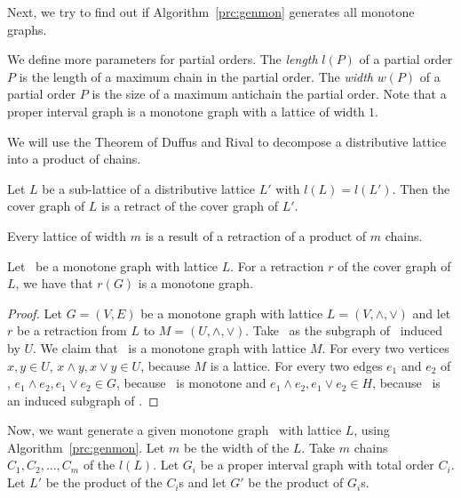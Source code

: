 Next, we try to find out if Algorithm~\ref{prc:genmon} generates all monotone graphs.

We define more parameters for partial orders.
The \emph{length} \(l(P)\) of a partial order \(P\) is the length of a maximum chain in
the partial order. The \emph{width} \(w(P)\) of a partial order \(P\)
is the size of a maximum antichain the partial order.
Note that a proper interval graph is a monotone graph with a lattice of width \(1\)\@.

We will use the Theorem of Duffus and Rival to decompose a distributive lattice into a
product of chains.

\begin{theorem}  \label{thm:DR}
Let \(L\) be a sub-lattice of a distributive lattice \(L'\) with
\(l(L)=l(L')\)\@. Then the cover graph of \(L\) is a retract of the cover graph of 
\(L'\)\@.
\end{theorem}

\begin{cor}
Every lattice of width \(m\) is a result of a retraction of a product of \(m\) chains.
\end{cor}

\begin{lemma} \label{lem:retract}
Let \mG\ be a monotone graph with lattice \(L\)\@.
For a retraction \(r\) of the cover graph of \(L\), we have that \(r(G)\) is a monotone graph.
\end{lemma}

\begin{proof}
Let \(G=(V,E)\) be a monotone graph with lattice \(L=(V, \wedge,\vee)\) and
let \(r\) be a retraction from \(L\) to \(M =(U, \wedge, \vee)\)\@.
Take \mH\ as the subgraph of \mG\ induced by \(U\)\@.
We claim that \mH\ is a monotone graph with lattice \(M\)\@.
For every two vertices \(x,y\in U\), 
\(x\wedge y,x\vee y\in U\), because \(M\) is a lattice. For every two edges \(e_1\) and \(e_2\) of
\mH, \(e_1\wedge e_2,e_1\vee e_2\in G\), because  \mG\ is monotone and
\(e_1\wedge e_2,e_1\vee e_2\in H\), because \mH\ is an induced subgraph of \mG\@. 
\end{proof}

Now, we want generate a given monotone graph \mG\ with lattice \(L\),
using Algorithm~\ref{prc:genmon}. Let \(m\) be the width of the \(L\)\@.
Take \(m\) chains \(C_1,C_2,\dotsc,C_m\) of the \(l(L)\)\@.
Let \(G_i\) be a proper interval graph with total order \(C_i\). 
Let \(L'\) be the product of the \(C_i\)s and let \(G'\) be the product of \(G_i\)s.

